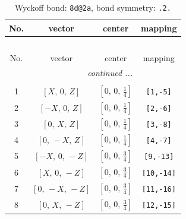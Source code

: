 \documentclass[fleqn,8pt]{jsarticle}
\begin{document}
\begin{longtable}{cccc}
\caption{Wyckoff bond: {\tt 8d@2a}, bond symmetry: {\tt .2.}}
 \\
 \hline \hline
No. & vector & center & mapping \\ \hline \endfirsthead

\multicolumn{3}{l}{\tablename\ \thetable{}} \\
 \hline \hline
No. & vector & center & mapping \\ \hline \endhead

 \hline \hline
\multicolumn{3}{r}{\footnotesize\it continued ...} \\ \endfoot

 \hline \hline
\multicolumn{3}{r}{} \\ \endlastfoot

1 & $\left[ X,\, 0,\, Z \right]$ & $\left[ 0,\, 0,\, \frac{1}{4} \right]$ & {\tt [1,-5]} \\ \hline
2 & $\left[ - X,\, 0,\, Z \right]$ & $\left[ 0,\, 0,\, \frac{1}{4} \right]$ & {\tt [2,-6]} \\ \hline
3 & $\left[ 0,\, X,\, Z \right]$ & $\left[ 0,\, 0,\, \frac{1}{4} \right]$ & {\tt [3,-8]} \\ \hline
4 & $\left[ 0,\, - X,\, Z \right]$ & $\left[ 0,\, 0,\, \frac{1}{4} \right]$ & {\tt [4,-7]} \\ \hline
5 & $\left[ - X,\, 0,\, - Z \right]$ & $\left[ 0,\, 0,\, \frac{3}{4} \right]$ & {\tt [9,-13]} \\ \hline
6 & $\left[ X,\, 0,\, - Z \right]$ & $\left[ 0,\, 0,\, \frac{3}{4} \right]$ & {\tt [10,-14]} \\ \hline
7 & $\left[ 0,\, - X,\, - Z \right]$ & $\left[ 0,\, 0,\, \frac{3}{4} \right]$ & {\tt [11,-16]} \\ \hline
8 & $\left[ 0,\, X,\, - Z \right]$ & $\left[ 0,\, 0,\, \frac{3}{4} \right]$ & {\tt [12,-15]} \\
\end{longtable}
\renewcommand{\arraystretch}{1.2}
\end{document}
